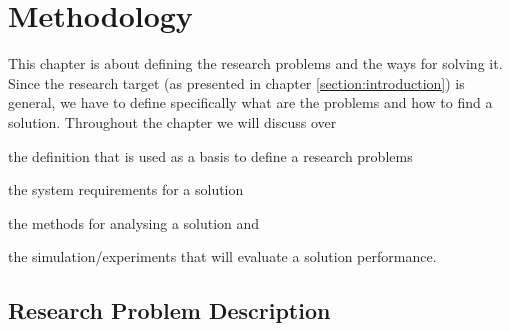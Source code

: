 \section{Methodology}

This chapter is about defining the research problems and the ways for solving it. Since the research target (as presented in chapter \ref{section:introduction}) is general, we have to define specifically what are the problems and how to find a solution. Throughout the chapter we will discuss over
\begin{inparaenum}
\item the definition that is used as a basis to define a research problems
\item the system requirements for a solution
\item the methods for analysing a solution 
and
\item the simulation/experiments that will evaluate a solution performance.
\end{inparaenum} 

 


\subsection{Research Problem Description}
\label{section:problem_description}

